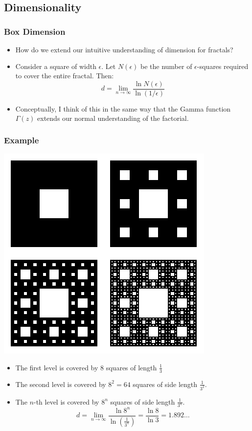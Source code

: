 \documentclass[9pt]{beamer}
\begin{document}
\subsection{Dimensionality}
\begin{frame}
	\frametitle{Box Dimension}
	\begin{itemize}
		\item How do we extend our intuitive understanding of dimension for fractals?
		\item Consider a square of width \( \epsilon \). Let \( N(\epsilon) \)
			be the number of \( \epsilon \)-squares required to cover the entire
			fractal. Then:
			\[
				d = \lim_{n \to \infty}\frac{\ln N(\epsilon)}{\ln(1 / \epsilon)}
			\]
		\item Conceptually, I think of this in the same way that the Gamma function
			\( \Gamma(z) \) extends our normal understanding of the factorial.
	\end{itemize}
\end{frame}

\begin{frame}
	\frametitle{Example}
	\begin{center}
		\includegraphics[scale=0.3]{images/sierpinski_carpet.png}
	\end{center}
	\begin{itemize}
		\item The first level is covered by 8 squares of length \( \frac{1}{3} \)
		\item The second level is covered by \( 8^2 = 64 \) squares of side length \(
			\frac{1}{3^2}\). 
		\item The \( n \)-th level is covered by \( 8^{n} \) squares of side length
			\( \frac{1}{3^{n}} \).
			\[
				d = \lim_{n \to \infty}\frac{\ln 8^{n}}{\ln (\frac{1}{3^{n}})} =
				\frac{\ln 8}{\ln 3} = 1.892\dots
			\]
	\end{itemize}
\end{frame}
\end{document}
